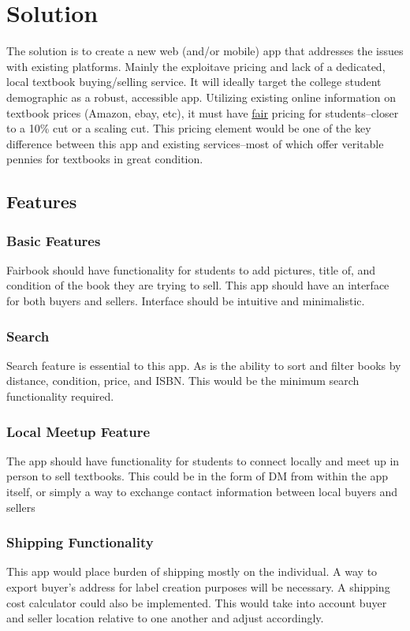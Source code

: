\documentclass[12pt]{article}
\begin{document}
	\section{Solution}

	The solution is to create a new web (and/or mobile) app that addresses the issues with existing platforms. Mainly the
	exploitave pricing and lack of a dedicated, local textbook buying/selling service.
	It will ideally target the college student demographic as a robust, accessible app. Utilizing existing online
        information on textbook prices (Amazon, ebay, etc), it must have \underline{fair} pricing for students--closer to a 10\% cut or a scaling cut. 
	This pricing element would be one of the key difference between this app and existing services--most of which offer veritable pennies for
	textbooks in great condition.
	\subsection{Features}
		\subsubsection{Basic Features}
		Fairbook should have functionality for students to add pictures, title of, and condition of the book they are trying to sell.
		This app should have an interface for both buyers and sellers. Interface should be intuitive and minimalistic.
		\subsubsection{Search}
        	Search feature is essential to this app. As is the ability to sort and filter books by distance, condition, price, and ISBN. This would be the minimum
		search functionality required.
		\subsubsection{Local Meetup Feature}
		The app should have functionality for students to connect locally and meet up in person to sell textbooks.
		This could be in the form of DM from within the app itself, or simply a way to exchange contact information between local buyers and sellers	
		\subsubsection{Shipping Functionality}
		This app would place burden of shipping mostly on the individual. A way to export buyer's address for label creation
		purposes will be necessary. A shipping cost calculator could also be implemented. This would take into account buyer and seller location
		relative to one another and adjust accordingly. 
\end{document}
